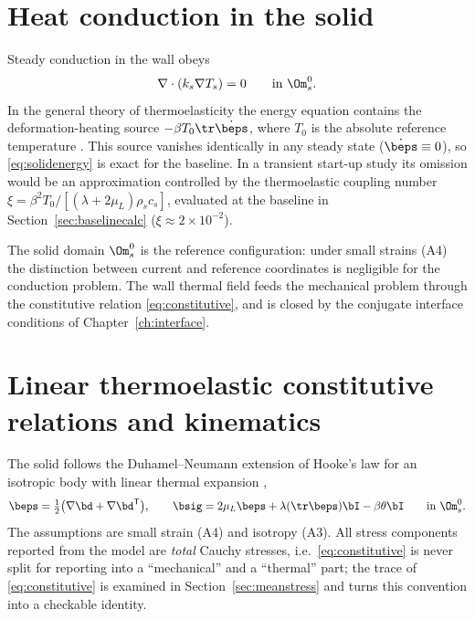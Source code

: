 \section{Heat conduction in the solid}
Steady conduction in the wall obeys \cite{carslaw1947conduction}
\begin{equation}
\nabla\cdot(k_s\nabla T_s)=0 \qquad \text{in } \Om_s^0 .
\label{eq:solidenergy}
\end{equation}
In the general theory of thermoelasticity the energy equation contains the deformation-heating
source $-\beta T_0\tr\dot{\beps}$, where $T_0$ is the absolute reference temperature
\cite{boley1960theory}. This source vanishes identically in any steady state
($\dot{\beps}\equiv0$), so \eqref{eq:solidenergy} is exact for the baseline. In a transient
start-up study its omission would be an approximation controlled by the thermoelastic coupling
number $\xi=\beta^2T_0/[(\lambda+2\mu_L)\rho_sc_s]$, evaluated at the baseline in
Section~\ref{sec:baselinecalc} ($\xi\approx2\times10^{-2}$).

The solid domain $\Om_s^0$ is the reference configuration: under small strains (A4) the distinction
between current and reference coordinates is negligible for the conduction problem. The wall thermal
field feeds the mechanical problem through the constitutive relation \eqref{eq:constitutive}, and
is closed by the conjugate interface conditions of Chapter~\ref{ch:interface}.

\section{Linear thermoelastic constitutive relations and kinematics}
The solid follows the Duhamel--Neumann extension of Hooke's law for an isotropic body with linear
thermal expansion \cite{boley1960theory,timoshenko1970elasticity},
\begin{equation}
\beps=\tfrac12\big(\nabla\bd+\nabla\bd^{\mathsf T}\big),\qquad
\bsig = 2\mu_L\beps + \lambda(\tr\beps)\bI - \beta\theta\bI
\qquad \text{in } \Om_s^0 .
\label{eq:constitutive}
\end{equation}
The assumptions are small strain (A4) and isotropy (A3). All stress components reported from the
model are \emph{total} Cauchy stresses, i.e.\ \eqref{eq:constitutive} is never split for reporting
into a ``mechanical'' and a ``thermal'' part; the trace of \eqref{eq:constitutive} is examined in
Section~\ref{sec:meanstress} and turns this convention into a checkable identity.

